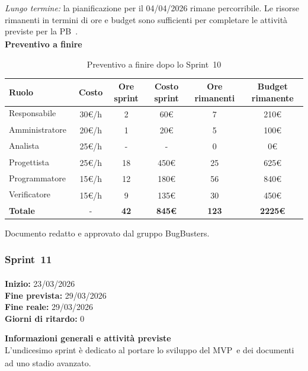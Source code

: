 \documentclass[a4paper,12pt]{article}
\newcommand{\pediceG}{\texorpdfstring{\textsubscript{\scalebox{0.6}{\textbf{G}}}~}{G}}
\begin{document}
\textit{Lungo termine:} la pianificazione per il 04/04/2026 rimane percorribile. Le risorse rimanenti in termini di ore e budget sono sufficienti per completare le attività previste per la PB\pediceG.\\

\noindent\textbf{Preventivo a finire}

\begin{table}[H]
\centering
\footnotesize
\begin{tabular}{|l|c|c|c|c|c|}
\hline
Ruolo & Costo & Ore sprint & Costo sprint & Ore rimanenti & Budget rimanente \\
\hline
Responsabile\pediceG & 30€/h & 2 & 60€ & 7 & 210€ \\
\hline
Amministratore\pediceG & 20€/h & 1 & 20€ & 5 & 100€ \\
\hline
Analista\pediceG & 25€/h & - & - & 0 & 0€ \\
\hline
Progettista\pediceG & 25€/h & 18 & 450€ & 25 & 625€ \\
\hline
Programmatore\pediceG & 15€/h & 12 & 180€ & 56 & 840€ \\
\hline
Verificatore\pediceG & 15€/h & 9 & 135€ & 30 & 450€ \\
\hline
\textbf{Totale} & - & \textbf{42} & \textbf{845€} & \textbf{123} & \textbf{2225€} \\
\hline
\end{tabular}
\caption{Preventivo a finire dopo lo Sprint\pediceG 10}
\label{tab:risorse-sprint10}
\end{table}
 
\vfill
\begin{center}
    {\small\color{darkgray} Documento redatto e approvato dal gruppo BugBusters.}
\end{center}

\subsubsection{Sprint\pediceG 11}

\textbf{Inizio:} 23/03/2026 \\
\textbf{Fine prevista:} 29/03/2026 \\
\textbf{Fine reale:} 29/03/2026 \\
\textbf{Giorni di ritardo:} 0
 
\noindent\textbf{Informazioni generali e attività previste}\\
L'undicesimo sprint è dedicato al portare lo sviluppo del MVP\pediceG e dei documenti ad uno stadio avanzato.
 
\end{document}
